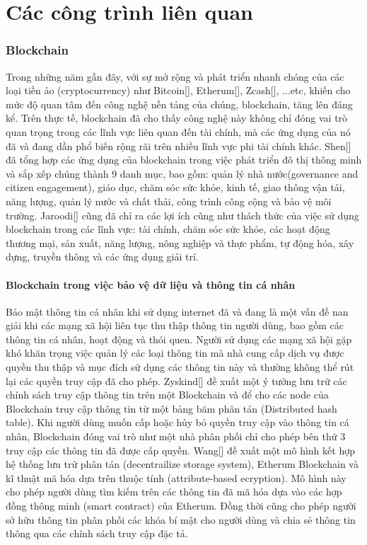 \chapter{Các công trình liên quan}
\label{Chapter2}
\subsection{Blockchain}
Trong những năm gần đây, với sự mở rộng và phát triển nhanh chóng của các loại
tiền ảo (cryptocurrency) như Bitcoin[], Etherum[], Zcash[], ...etc, khiến cho
mức độ quan tâm đến công nghệ nền tảng của chúng, blockchain, tăng lên đáng kể.
Trên thực tế, blockchain đã cho thấy công nghệ này không chỉ đóng vai trò quan
trọng trong các lĩnh vực liên quan đến tài chính, mà các ứng dụng của nó đã và
đang dần phổ biến rộng rãi trên nhiều lĩnh vực phi tài chính khác. Shen[] đã
tổng hợp các ứng dụng của blockchain trong việc phát triển đô thị thông minh và
sắp xếp chúng thành 9 danh mục, bao gồm: quản lý nhà nước(governance and
citizen engagement), giáo dục, chăm sóc sức khỏe, kinh tế, giao thông vận tải,
năng lượng, quản lý nước và chất thải, công trình công cộng và bảo vệ môi
trường. Jaroodi[] cũng đã chỉ ra các lợi ích cũng như thách thức của việc sử
dụng blockchain trong các lĩnh vực: tài chính, chăm sóc sức khỏe, các hoạt động
thương mại, sản xuất, năng lượng, nông nghiệp và thực phẩm, tự động hóa, xây
dựng, truyền thông và các ứng dụng giải trí.
\subsubsection{Blockchain trong việc bảo vệ dữ liệu và thông tin cá nhân}
Bảo mật thông tin cá nhân khi sử dụng internet đã và đang là một vấn đề nan
giải khi các mạng xã hội liên tục thu thập thông tin người dùng, bao gồm các
thông tin cá nhân, hoạt động và thói quen. Người sử dụng các mạng xã hội gặp
khó khăn trọng việc quản lý các loại thông tin mà nhà cung cấp dịch vụ được
quyền thu thập và mục đích sử dụng các thông tin này và thường không thể rút
lại các quyền truy cập đã cho phép. Zyskind[] đề xuất một ý tưởng lưu trữ các
chính sách truy cập thông tin trên một Blockchain và để cho các node của
Blockchain truy cập thông tin từ một bảng băm phân tán (Distributed hash
table). Khi người dùng muốn cấp hoặc hủy bỏ quyền truy cập vào thông tin cá
nhân, Blockchain đóng vai trò như một nhà phân phối chỉ cho phép bên thứ 3 truy
cập các thông tin đã được cấp quyền. Wang[] đề xuất một mô hình kết hợp hệ
thống lưu trữ phân tán (decentrailize storage system), Etherum Blockchain và kĩ
thuật mã hóa dựa trên thuộc tính (attribute-based ecryption). Mô hình này cho
phép người dùng tìm kiếm trên các thông tin đã mã hóa dựa vào các hợp đồng
thông minh (smart contract) của Etherum. Đồng thời cũng cho phép người sở hữu
thông tin phân phối các khóa bí mật cho người dùng và chia sẻ thông tin thông
qua các chính sách truy cập đặc tả. \\
